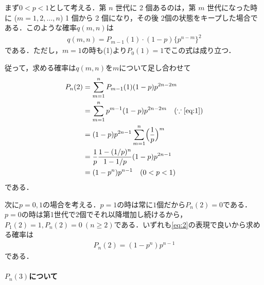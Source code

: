 \documentclass[../../main.tex]{subfiles}
\begin{document}
まず$0<p<1$として考える．第 $n$ 世代に 2 個あるのは，第 $m$ 世代になった時に ($m=1, 2, \dots, n$) 1 個から 2 個になり，その後 $2$個の状態をキープした場合である．このような確率$q(m,n)$は
\begin{align}
  q(m,n) = P_{m-1}(1) \cdot (1-p) \{ p^{n-m} \}^2
\end{align}
である．ただし，$m=1$の時も(1)より$P_{0}(1)=1$でこの式は成り立つ．

従って，求める確率は$q(m,n)$を$m$について足し合わせて
\begin{align}
  P_n(2)
  &= \sum_{m=1}^n P_{m-1}(1) (1-p) p^{2n-2m} \\
  &= \sum_{m=1}^n p^{m-1} (1-p) p^{2n-2m} \quad (\because \text{\cref{eq:1}})\\
  &= (1-p) p^{2n-1} \sum_{m=1}^n \Bigl(\dfrac{1}{p}\Bigr)^m \\
  &= \dfrac{1}{p} \dfrac{1-(1/p)^n}{1-1/p} (1-p) p^{2n-1} \\
  &= (1-p^n) p^{n-1} \quad (0<p<1) \label{eq:2}
\end{align}
である．

次に$p=0,1$の場合を考える．$p=1$の時は常に$1$個だから$P_n(2)=0$である．
$p=0$の時は第1世代で$2$個でそれ以降増加し続けるから，$P_1(2)=1, P_n(2)=0 \ (n \ge 2)$である．いずれも\cref{eq:2}の表現で良いから求める確率は
\begin{align}
  P_n(2)= (1-p^n) p^{n-1}
\end{align}
である．

\paragraph{$P_n(3)$について}
\end{document}
